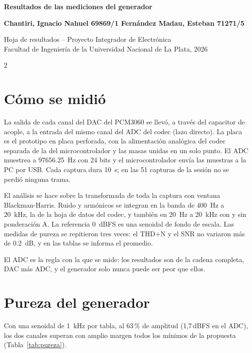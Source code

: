 \documentclass[a4paper,10pt]{article}
\newcommand{\m}{\textminus}                    %
\begin{document}
\begin{center}
  {\LARGE\bfseries Resultados de las mediciones del generador\par}
  \vspace{0.7em}
  {\large\bfseries Chantiri, Ignacio Nahuel 69869/1 \quad Fernández Madau, Esteban 71271/5\par}
  \vspace{0.5em}
  {\normalsize Hoja de resultados -- Proyecto Integrador de Electrónica\\[0.2ex]
  Facultad de Ingeniería de la Universidad Nacional de La Plata, 2026\par}
\end{center}
\vspace{0.3em}

\begin{multicols}{2}

\section{Cómo se midió}
La salida de cada canal del DAC del PCM3060 se llevó, a través del capacitor de acople, a la entrada del
mismo canal del ADC del codec (lazo directo). La placa es el prototipo en placa perforada, con la
alimentación analógica del codec separada de la del microcontrolador y las masas unidas en un solo punto.
El ADC muestrea a \SI{97656,25}{Hz} con 24 bits y el microcontrolador envía las muestras a la PC por USB.
Cada captura dura \SI{10}{s}; en las 51 capturas de la sesión no se perdió ninguna trama.

El análisis se hace sobre la transformada de toda la captura con ventana Blackman-Harris. Ruido y
armónicos se integran en la banda de \SI{400}{Hz} a \SI{20}{kHz}, la de la hoja de datos del codec,
y también en \SI{20}{Hz} a \SI{20}{kHz} con y sin ponderación A. La referencia \SI{0}{dBFS} es una
senoidal de fondo de escala. Las medidas de pureza se repitieron tres veces: el THD+N y el SNR no
variaron más de \SI{0,2}{dB}, y en las tablas se informa el promedio.

El ADC es la regla con la que se mide: los resultados son de la cadena completa, DAC más ADC, y
el generador solo nunca puede ser peor que ellos.

\section{Pureza del generador}
Con una senoidal de \SI{1}{kHz} por tabla, al 63\,\% de amplitud (\m{}1,7\,dBFS en el ADC), los dos
canales superan con amplio margen todos los mínimos de la propuesta (Tabla~\ref{tab:pureza}).


\end{multicols}
\end{document}
